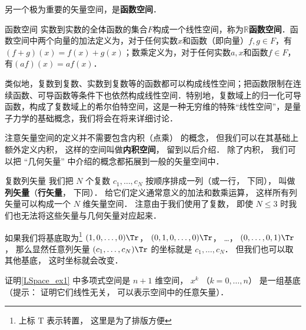 另一个极为重要的矢量空间，是\textbf{函数空间}．

\begin{example}{函数空间}
实数到实数的全体函数的集合$F$构成一个线性空间，称为$\mathbb{R}$\textbf{函数空间}．函数空间中两个向量的加法定义为，对于任何实数$x$和函数（即向量）$f, g\in F$，有$(f+g)(x)=f(x)+g(x)$；数乘定义为，对于任何实数$a, x$和函数$f\in F$，有$(af)(x)=af(x)$．

类似地，复数到复数、实数到复数等的函数都可以构成线性空间；把函数限制在连续函数、可导函数等条件下也依然构成线性空间．特别地，复数域上的归一化可导函数，构成了复数域上的希尔伯特空间，这是一种无穷维的特殊“线性空间”，是量子力学的基础概念，我们将会在将来详细讨论．
\end{example}

注意矢量空间的定义并不需要包含内积（点乘） 的概念， 但我们可以在其基础上额外定义内积， 这样的空间叫做\textbf{内积空间}， 留到以后介绍． 除了内积， 我们可以把 “几何矢量” 中介绍的概念都拓展到一般的矢量空间中．

\begin{exercise}{复数列矢量}
我们把 $N$ 个复数 $c_1, \dots, c_N$ 按顺序排成一列（或一行， 下同）， 叫做\textbf{列矢量}（\textbf{行矢量}， 下同）． 给它们定义通常意义的加法和数乘运算， 这样所有列矢量可以构成一个 $N$ 维矢量空间． 注意由于我们使用了复数， 即使 $N \leqslant 3$ 时我们也无法将这些矢量与几何矢量对应起来．

如果我们将基底取为\footnote{上标 $\mathrm T$ 表示转置， 这里是为了排版方便} $(1, 0, \dots, 0)\Tr$， $(0, 1, 0, \dots, 0)\Tr$， …， $(0, \dots, 0, 1)\Tr$， 那么显然任意列矢量 $(c_1, \dots, c_N)\Tr$ 的坐标就是 $c_1, \dots, c_N$． 但我们也可以取其他基底， 这时坐标就会改变．
\end{exercise}

\begin{exercise}{}
证明\autoref{LSpace_ex1} 中多项式空间是 $n+1$ 维空间， $x^k$ （$k = 0, \dots, n$） 是一组基底（提示： 证明它们线性无关， 可以表示空间中的任意矢量）．
\end{exercise}
